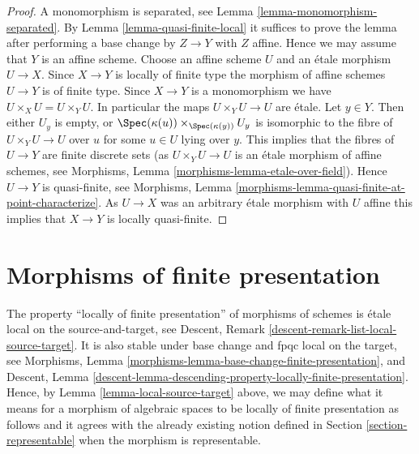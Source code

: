 \begin{proof}
A monomorphism is separated, see
Lemma \ref{lemma-monomorphism-separated}.
By
Lemma \ref{lemma-quasi-finite-local}
it suffices to prove the lemma after performing a base change
by $Z \to Y$ with $Z$ affine. Hence we may assume that $Y$ is an
affine scheme. Choose an affine scheme $U$ and an \'etale morphism
$U \to X$. Since $X \to Y$ is locally of finite type the morphism
of affine schemes $U \to Y$ is of finite type.
Since $X \to Y$ is a monomorphism we have $U \times_X U = U \times_Y U$.
In particular the maps $U \times_Y U \to U$ are \'etale.
Let $y \in Y$. Then either $U_y$ is empty, or
$\Spec(\kappa(u)) \times_{\Spec(\kappa(y))} U_y$
is isomorphic to the fibre of $U \times_Y U \to U$ over $u$ for
some $u \in U$ lying over $y$. This implies that the fibres of
$U \to Y$ are finite discrete sets (as $U \times_Y U \to U$
is an \'etale morphism of affine schemes, see
Morphisms, Lemma \ref{morphisms-lemma-etale-over-field}).
Hence $U \to Y$ is quasi-finite, see
Morphisms, Lemma \ref{morphisms-lemma-quasi-finite-at-point-characterize}.
As $U \to X$ was an arbitrary \'etale morphism with $U$ affine
this implies that $X \to Y$ is locally quasi-finite.
\end{proof}













\section{Morphisms of finite presentation}
\label{section-finite-presentation}

\noindent
The property ``locally of finite presentation'' of morphisms of schemes is
\'etale local on the source-and-target, see
Descent, Remark \ref{descent-remark-list-local-source-target}.
It is also stable under base change and fpqc local on the target, see
Morphisms, Lemma \ref{morphisms-lemma-base-change-finite-presentation}, and
Descent,
Lemma \ref{descent-lemma-descending-property-locally-finite-presentation}.
Hence, by
Lemma \ref{lemma-local-source-target}
above, we may define what it means for a morphism of algebraic spaces
to be locally of finite presentation as
follows and it agrees with the already existing notion defined in
Section \ref{section-representable}
when the morphism is representable.

